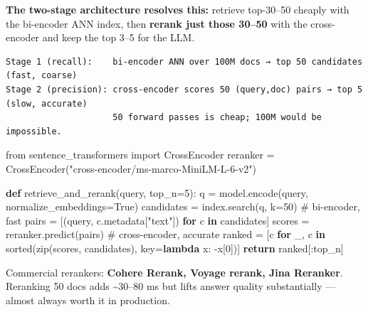 \documentclass[11pt]{article}
\newenvironment{Shaded}{\begin{snugshade}}{\end{snugshade}}
\newcommand{\BuiltInTok}[1]{\textcolor[rgb]{0.50,0.55,0.55}{#1}}
\newcommand{\CommentTok}[1]{\textcolor[rgb]{0.48,0.49,0.49}{#1}}
\newcommand{\ControlFlowTok}[1]{\textcolor[rgb]{0.99,0.74,0.29}{\textbf{#1}}}
\newcommand{\DecValTok}[1]{\textcolor[rgb]{0.96,0.45,0.00}{#1}}
\newcommand{\ImportTok}[1]{\textcolor[rgb]{0.15,0.68,0.38}{#1}}
\newcommand{\KeywordTok}[1]{\textcolor[rgb]{0.81,0.81,0.76}{\textbf{#1}}}
\newcommand{\NormalTok}[1]{\textcolor[rgb]{0.81,0.81,0.76}{#1}}
\newcommand{\OperatorTok}[1]{\textcolor[rgb]{0.81,0.81,0.76}{#1}}
\newcommand{\StringTok}[1]{\textcolor[rgb]{0.96,0.31,0.31}{#1}}
\newcommand{\VariableTok}[1]{\textcolor[rgb]{0.15,0.68,0.68}{#1}}
\begin{document}
\textbf{The two-stage architecture resolves this:} retrieve top-30--50 cheaply with the bi-encoder ANN index, then \textbf{rerank just those 30--50} with the cross-encoder and keep the top 3--5 for the LLM.

\setcodelang{}

\begin{verbatim}
Stage 1 (recall):    bi-encoder ANN over 100M docs → top 50 candidates   (fast, coarse)
Stage 2 (precision): cross-encoder scores 50 (query,doc) pairs → top 5   (slow, accurate)
                     50 forward passes is cheap; 100M would be impossible.
\end{verbatim}


\begin{Shaded}
\begin{Highlighting}[]
\ImportTok{from}\NormalTok{ sentence\_transformers }\ImportTok{import}\NormalTok{ CrossEncoder}
\NormalTok{reranker }\OperatorTok{=}\NormalTok{ CrossEncoder(}\StringTok{"cross{-}encoder/ms{-}marco{-}MiniLM{-}L{-}6{-}v2"}\NormalTok{)}

\KeywordTok{def}\NormalTok{ retrieve\_and\_rerank(query, top\_n}\OperatorTok{=}\DecValTok{5}\NormalTok{):}
\NormalTok{    q }\OperatorTok{=}\NormalTok{ model.encode(query, normalize\_embeddings}\OperatorTok{=}\VariableTok{True}\NormalTok{)}
\NormalTok{    candidates }\OperatorTok{=}\NormalTok{ index.search(q, k}\OperatorTok{=}\DecValTok{50}\NormalTok{)                      }\CommentTok{\# bi{-}encoder, fast}
\NormalTok{    pairs }\OperatorTok{=}\NormalTok{ [(query, c.metadata[}\StringTok{"text"}\NormalTok{]) }\ControlFlowTok{for}\NormalTok{ c }\KeywordTok{in}\NormalTok{ candidates]}
\NormalTok{    scores }\OperatorTok{=}\NormalTok{ reranker.predict(pairs)                        }\CommentTok{\# cross{-}encoder, accurate}
\NormalTok{    ranked }\OperatorTok{=}\NormalTok{ [c }\ControlFlowTok{for}\NormalTok{ \_, c }\KeywordTok{in} \BuiltInTok{sorted}\NormalTok{(}\BuiltInTok{zip}\NormalTok{(scores, candidates), key}\OperatorTok{=}\KeywordTok{lambda}\NormalTok{ x: }\OperatorTok{{-}}\NormalTok{x[}\DecValTok{0}\NormalTok{])]}
    \ControlFlowTok{return}\NormalTok{ ranked[:top\_n]}
\end{Highlighting}
\end{Shaded}

Commercial rerankers: \textbf{Cohere Rerank, Voyage rerank, Jina Reranker}. Reranking 50 docs adds \textasciitilde30--80 ms but lifts answer quality substantially --- almost always worth it in production.
\end{document}
